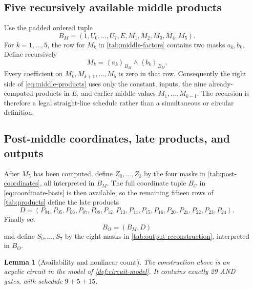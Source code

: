 \documentclass[11pt]{article}
\newtheorem{lemma}[lemma]{Lemma}
\theoremstyle{definition}
\newcommand{\mask}[2]{\left\langle #1\right\rangle_{#2}}
\begin{document}
\subsection{Five recursively available middle products}

Use the padded ordered tuple
\begin{equation}
 B_M=(1,U_0,\ldots,U_7,E,M_1,M_2,M_3,M_4,M_5).
 \label{eq:middle-basis}
\end{equation}
For \(k=1,\ldots,5\), the row for \(M_k\) in \cref{tab:middle-factors} contains two masks
\(a_k,b_k\).  Define recursively
\begin{equation}
  M_k=\mask{a_k}{B_M}\wedge\mask{b_k}{B_M}.
  \label{eq:middle-products}
\end{equation}
Every coefficient on \(M_k,M_{k+1},\ldots,M_5\) is zero in that row.  Consequently the right side of
\cref{eq:middle-products} uses only the constant, inputs, the nine already-computed products in
\(E\), and earlier middle values \(M_1,\ldots,M_{k-1}\).  The recursion is therefore a legal
straight-line schedule rather than a simultaneous or circular definition.

\subsection{Post-middle coordinates, late products, and outputs}

After \(M_5\) has been computed, define \(Z_0,\ldots,Z_3\) by the four masks in
\cref{tab:post-coordinates}, all interpreted in \(B_M\).  The full coordinate tuple \(B_C\) in
\cref{eq:coordinate-basis} is then available, so the remaining fifteen rows of
\cref{tab:products} define the late products
\begin{equation}
 D=(P_{04},P_{05},P_{06},P_{07},P_{08},P_{12},P_{13},P_{14},P_{15},P_{16},
 P_{20},P_{21},P_{22},P_{23},P_{24}).
 \label{eq:late-products}
\end{equation}
Finally set
\[
 B_O=(B_M,D)
\]
and define \(S_0,\ldots,S_7\) by the eight masks in
\cref{tab:output-reconstruction}, interpreted in \(B_O\).

\begin{lemma}[Availability and nonlinear count]
\label{lem:availability}
The construction above is an acyclic circuit in the model of \cref{def:circuit-model}.  It contains
exactly 29 AND gates, with schedule \(9+5+15\).
\end{lemma}
\end{document}
